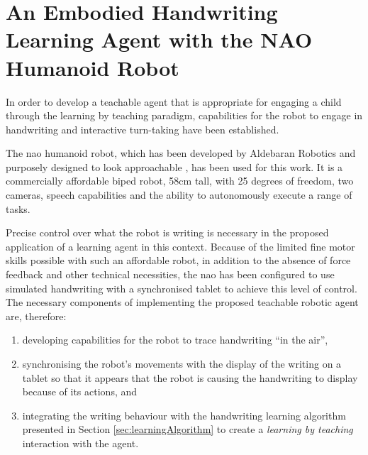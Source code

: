 \documentclass{sig-alternate}
\begin{document}
\section{An Embodied Handwriting Learning Agent with the NAO Humanoid Robot}
\label{sec:robotWriting}

In order to develop a teachable agent that is appropriate for engaging a child
through the learning by teaching paradigm, 
capabilities for the robot to engage in handwriting and interactive turn-taking have been established.

The {\sc nao} humanoid robot, which has been developed by Aldebaran Robotics and 
purposely designed to look approachable \cite{Gouaillier2008}, has been used for
this work. It is a commercially affordable biped robot, 58cm tall, with 25
degrees of freedom, two cameras, speech capabilities and the ability to
autonomously execute a range of tasks.

Precise control over what the robot is writing is necessary in the
proposed application of a learning agent in this context. Because
of the limited fine motor skills possible with such an affordable robot, in
addition to the absence of force feedback and other technical necessities, the
{\sc nao} has been configured to use simulated handwriting with a synchronised tablet
to achieve this level of control. The necessary components of implementing the
proposed teachable robotic agent are, therefore:

\begin{enumerate}
    \item developing capabilities for the robot to trace handwriting ``in the air'', 

    \item synchronising the robot's movements with the display of the writing on a
        tablet so that it appears that the robot is causing the handwriting to
        display because of its actions, and

    \item integrating the writing behaviour with the handwriting learning
        algorithm presented in Section \ref{sec:learningAlgorithm} to create a
        \emph{learning by teaching} interaction with the agent. 
\end{enumerate}
\end{document}
